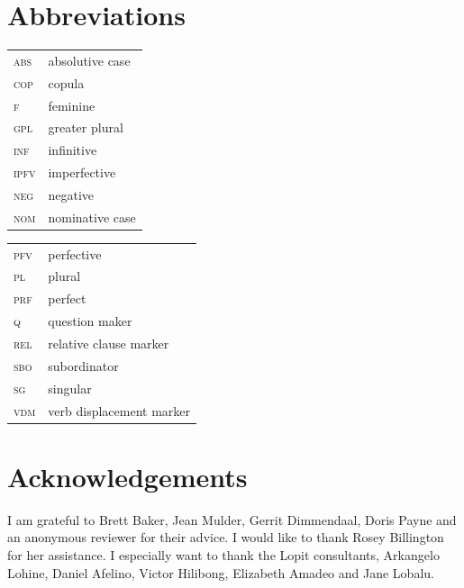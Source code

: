 \documentclass[output=paper]{langsci/langscibook}
\begin{document}
\section*{Abbreviations}
\begin{tabularx}{.45\textwidth}{lX}
\textsc{abs} & absolutive case \\

\textsc{cop} & copula \\

\textsc{f} & feminine \\

\textsc{gpl} & greater plural \\

\textsc{inf} & infinitive \\

\textsc{ipfv} & imperfective \\

\textsc{neg} & negative \\

\textsc{nom} & nominative case \\

\end{tabularx}
\begin{tabularx}{.45\textwidth}{lX}

\textsc{pfv} & perfective \\

\textsc{pl} & plural \\

\textsc{prf} & perfect \\

\textsc{q} & question maker \\

\textsc{rel} & relative clause marker \\

\textsc{sbo} &  subordinator \\

\textsc{sg} & singular \\

\textsc{vdm} & verb displacement marker \\
\end{tabularx}

\section*{Acknowledgements}

I am grateful to Brett Baker, Jean Mulder, Gerrit Dimmendaal, Doris Payne and an anonymous reviewer for their advice. I would like to thank Rosey Billington for her assistance. I especially want to thank the Lopit consultants, Arkangelo Lohine, Daniel Afelino, Victor Hilibong, Elizabeth Amadeo and Jane Lobalu.

\printbibliography[heading=subbibliography,notkeyword=this]
\end{document}
